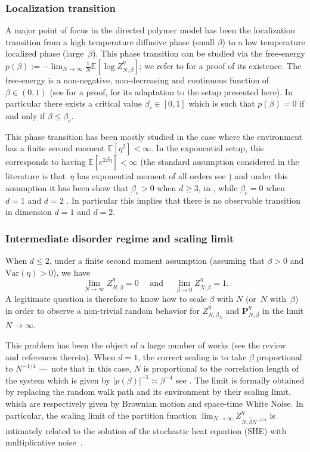 \documentclass[10pt]{amsart}
\theoremstyle{definition}
\newcommand{\bP}{{\ensuremath{\mathbf P}} }
\newcommand{\Var}{\mathrm{Var}}
\newcommand{\bbE}{{\ensuremath{\mathbb E}} }
\let\gb\beta
\begin{document}
\subsubsection*{Localization transition}

A major point of focus in the directed polymer model has been the localization transition from a high temperature diffusive phase (small $\beta$) to a low temperature localized phase (large~$\beta$).
This phase transition can be studied via the free-energy $p(\beta):= -\lim_{N\to \infty}\frac{1}{N} \bbE [\log Z^{\eta}_{N,\beta}]$;
we refer to \cite[Prop.\,2.5]{CSY03} for a proof of its existence.
The free-energy is a non-negative, non-decreasing and continuous function of $\beta\in (0,1)$
(see \cite[Th.\,3.2]{CSY06} for a proof, \cite[Th.\,A.1]{Vi19} for its adaptation to the setup presented here). In particular there exists a critical value $\beta_c\in [0,1]$ which is such that $p(\gb)=0$ if and only if $\beta \leq \gb_c$.

This phase transition has been mostly studied in the case where the environment has a finite second moment
$\bbE[\eta^2]<\infty$. In the exponential setup, this corresponds to having $\bbE[e^{2\beta\tilde \eta}]<\infty$ (the standard assumption considered in the literature is that~$\eta$ has exponential moment of all orders see \eg \cite{AKQ10})
and under this assumption it has been show that $\beta_c>0$ when $d\ge 3$, in \cite{Bol89,IS88}, while $\beta_c=0$ when $d=1$ \cite{CV06} and $d=2$ \cite{Lac10pol}. In particular this implies that there is no observable transition in dimension $d=1$ and $d=2$.

\subsubsection*{Intermediate disorder regime and scaling limit}

When $d \le 2$, under a finite second moment assumption (assuming that $\beta>0$ and $\Var(\eta)>0$), we have
\begin{equation}%
\lim_{N \to \infty} Z^{\eta}_{N,\beta}= 0 \quad \text{ and } \quad
\lim_{\beta\to 0} Z^{\eta}_{N,\beta}=1.
\end{equation}
A legitimate question is therefore to know how
to scale $\beta$ with $N$ (or~$N$ with~$\beta$) in order to observe a non-trivial random behavior for $Z^{\eta}_{N,\beta_N}$ and $\bP^{\eta}_{N,\beta}$ in the limit $N\to\infty$.

This problem has been the object of a large number of works \cite{AKQ10, CSZ14, CSZ13} (see the review~\cite{CSZreview} and references therein). When $d=1$, the correct scaling is to take $\beta$ proportional to $N^{-1/4}$
---~note that in this case, $N$ is proportional to the correlation length of the system which is given by $|p(\beta)|^{-1}\asymp \beta^{-4}$ see \cite{AY15, Nak16}.
The limit is formally obtained by replacing the random walk path and its environment by their scaling limit, which are respectively given by Brownian motion and space-time White Noise.
In particular, the scaling limit of the partition function $\lim_{N\to \infty} Z^{\eta}_{N, \hat \beta N^{-1/4}}$ is intimately related to the solution of the stochastic heat equation (SHE) with multiplicative noise~\cite{CB95}.
\end{document}
